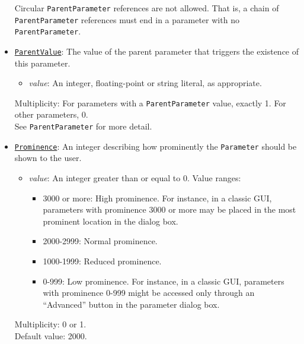 \documentclass[11pt]{article}
\begin{document}
\begin{itemize}
Circular {\tt ParentParameter} references are not allowed.  That is,
a chain of {\tt ParentParameter} references must end in a parameter
with no {\tt ParentParameter}.

\item \underline{\tt ParentValue}:  The value of the parent parameter
that triggers the existence of this parameter.
\begin{itemize}
\item {\it value}:  An integer, floating-point or string
  literal, as appropriate.
\end{itemize}
Multiplicity:  For parameters with a {\tt ParentParameter} value,
exactly 1.  For other parameters, 0. \\
See {\tt ParentParameter} for more detail.

\item \underline{\tt Prominence}:  An integer describing how
prominently the {\tt Parameter} should be shown to the user.
\begin{itemize}
\item {\it value}: An integer greater than or equal to 0.  Value ranges:
  \begin{itemize}
  \item 3000 or more:  High prominence.  For instance, in a
    classic GUI, parameters
    with prominence 3000 or more may be placed in the most
    prominent location in the dialog box.
  \item 2000-2999:  Normal prominence.
  \item 1000-1999:  Reduced prominence.
  \item 0-999:  Low prominence.  For instance, in a classic GUI,
    parameters with prominence 0-999 might be accessed only through an
    ``Advanced'' button in the parameter dialog box.
  \end{itemize}
\end{itemize}
Multiplicity: 0 or 1. \\
Default value: 2000.


\end{itemize}
\end{document}
